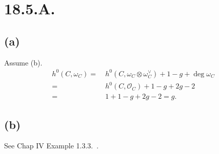 \section{18.5.A.}

\subsection{(a)}
Assume (b).
\begin{align*}
    h^0(C,\omega_C)=&~h^0(C,\omega_C\otimes \omega_C^{\vee})+1-g+\deg \omega_C\\
    =&~ h^0(C,\mathcal O_C)+1-g+2g-2\\
    =&~ 1+1-g+2g-2=g.
\end{align*}

\subsection{(b)}

See Chap IV Example 1.3.3.~\cite{hartshorne2013algebraic}.